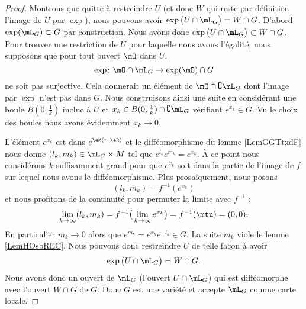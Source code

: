 \begin{proof}
    Montrons que quitte à restreindre \( U\) (et donc \( W\) qui reste par définition l'image de \( U\) par \( \exp\)), nous pouvons avoir \( \exp\big( U\cap\mL_G \big)=W\cap G\). D'abord \( \exp(\mL_G)\subset G\) par construction. Nous avons donc \( \exp\big( U\cap\mL_G \big)\subset W\cap G\). Pour trouver une restriction de \( U\) pour laquelle nous avons l'égalité, nous supposons que pour tout ouvert \( \mO\) dans \( U\), 
    \begin{equation}
        \exp\colon \mO\cap\mL_G\to \exp(\mO)\cap G
    \end{equation}
    ne soit pas surjective. Cela donnerait un élément de \( \mO\cap\complement\mL_G\) dont l'image par \( \exp\) n'est pas dans \( G\). Nous construisons ainsi une suite en considérant une boule \( B(0,\frac{1}{ k })\) inclue à \( U\) et \( x_k\in B(0,\frac{1}{ k })\cap\complement\mL_G\) vérifiant \(  e^{x_k}\in G\). Vu le choix des boules nous avons évidemment \( x_k\to 0\).

    L'élément \(  e^{x_k}\) est dans \(  e^{\eM(n,\eR)}\) et le difféomorphisme du lemme \ref{LemGGTtxdF} nous donne \( (l_k,m_k)\in \mL_G\times M\) tel que \(  e^{l_k} e^{m_k}= e^{x_k}\). À ce point nous considérons \( k\) suffisamment grand pour que \(  e^{x_k}\) soit dans la partie de l'image de \( f\) sur lequel nous avons le difféomorphisme. Plus prosaïquement, nous posons
    \begin{equation}
        (l_k,m_k)=f^{-1}( e^{x_k})
    \end{equation}
    et nous profitons de la continuité pour permuter la limite avec \( f^{-1}\) :
    \begin{equation}
        \lim_{k\to \infty} (l_k,m_k)=f^{-1}\big( \lim_{k\to \infty}  e^{x_k} \big)=f^{-1}(\mtu)=(0,0).
    \end{equation}
    En particulier \( m_k\to 0\) alors que \(  e^{m_k}= e^{x_k} e^{-l_k}\in G\). La suite \( m_k\) viole le lemme \ref{LemHOsbREC}. Nous pouvons donc restreindre \( U\) de telle façon à avoir
    \begin{equation}
        \exp\big( U\cap\mL_G \big)=W\cap G.
    \end{equation}
    Nous avons donc un ouvert de \( \mL_G\) (l'ouvert \( U\cap\mL_G\)) qui est difféomorphe avec l'ouvert \( W\cap G\) de \( G\). Donc \( G\) est une variété et accepte \( \mL_G\) comme carte locale.

\end{proof}


